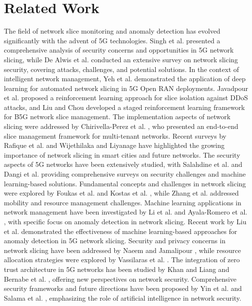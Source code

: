 \documentclass[12pt, a4paper]{article}
\begin{document}
\section{Related Work}
The field of network slice monitoring and anomaly detection has evolved significantly with the advent of 5G technologies. Singh et al. \cite{ref2} presented a comprehensive analysis of security concerns and opportunities in 5G network slicing, while De Alwis et al. \cite{ref3} conducted an extensive survey on network slicing security, covering attacks, challenges, and potential solutions. In the context of intelligent network management, Yeh et al. \cite{ref4} demonstrated the application of deep learning for automated network slicing in 5G Open RAN deployments. Javadpour et al. \cite{ref5} proposed a reinforcement learning approach for slice isolation against DDoS attacks, and Liu and Chou \cite{ref6} developed a staged reinforcement learning framework for B5G network slice management. The implementation aspects of network slicing were addressed by Chirivella-Perez et al. \cite{ref7}, who presented an end-to-end slice management framework for multi-tenant networks. Recent surveys by Rafique et al. \cite{ref8} and Wijethilaka and Liyanage \cite{ref9} have highlighted the growing importance of network slicing in smart cities and future networks. The security aspects of 5G networks have been extensively studied, with Salahdine et al. \cite{ref10} and Dangi et al. \cite{ref11} providing comprehensive surveys on security challenges and machine learning-based solutions. Fundamental concepts and challenges in network slicing were explored by Foukas et al. \cite{ref13} and Kostas et al. \cite{ref14}, while Zhang et al. \cite{ref15} addressed mobility and resource management challenges. Machine learning applications in network management have been investigated by Li et al. \cite{ref18} and Ayala-Romero et al. \cite{ref19}, with specific focus on anomaly detection in network slicing. Recent work by Liu et al. \cite{ref22} demonstrated the effectiveness of machine learning-based approaches for anomaly detection in 5G network slicing. Security and privacy concerns in network slicing have been addressed by Naeem and Jamalipour \cite{ref23}, while resource allocation strategies were explored by Vassilaras et al. \cite{ref24}. The integration of zero trust architecture in 5G networks has been studied by Khan and Liang \cite{ref29} and Bernabe et al. \cite{ref30}, offering new perspectives on network security. Comprehensive security frameworks and future directions have been proposed by Yin et al. \cite{ref35} and Salama et al. \cite{ref36}, emphasizing the role of artificial intelligence in network security.
\end{document}
